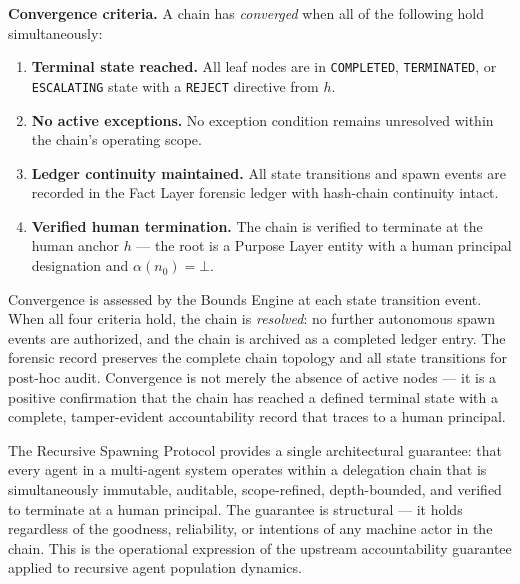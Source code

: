 \medskip
\noindent\textbf{Convergence criteria.} A chain has \emph{converged} when all of the following hold simultaneously:

\begin{enumerate}
    \item[(C1)] \textbf{Terminal state reached.} All leaf nodes are in \texttt{COMPLETED}, \texttt{TERMINATED}, or \texttt{ESCALATING} state with a \texttt{REJECT} directive from $h$.
    \item[(C2)] \textbf{No active exceptions.} No exception condition remains unresolved within the chain's operating scope.
    \item[(C3)] \textbf{Ledger continuity maintained.} All state transitions and spawn events are recorded in the Fact Layer forensic ledger with hash-chain continuity intact.
    \item[(C4)] \textbf{Verified human termination.} The chain is verified to terminate at the human anchor $h$ --- the root is a Purpose Layer entity with a human principal designation and $\alpha(n_0) = \bot$.
\end{enumerate}

Convergence is assessed by the Bounds Engine at each state transition event. When all four criteria hold, the chain is \emph{resolved}: no further autonomous spawn events are authorized, and the chain is archived as a completed ledger entry. The forensic record preserves the complete chain topology and all state transitions for post-hoc audit. Convergence is not merely the absence of active nodes --- it is a positive confirmation that the chain has reached a defined terminal state with a complete, tamper-evident accountability record that traces to a human principal.

\medskip

The Recursive Spawning Protocol provides a single architectural guarantee: that every agent in a multi-agent system operates within a delegation chain that is simultaneously immutable, auditable, scope-refined, depth-bounded, and verified to terminate at a human principal. The guarantee is structural --- it holds regardless of the goodness, reliability, or intentions of any machine actor in the chain. This is the operational expression of the upstream \bxthree{} accountability guarantee applied to recursive agent population dynamics.